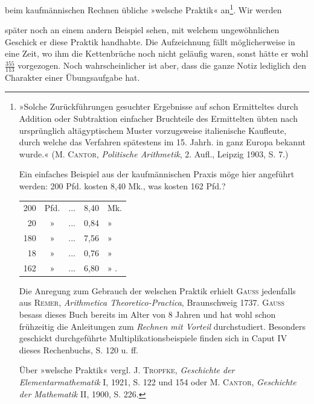 beim kaufmännischen Rechnen übliche »welsche Praktik« an\footnote{»Solche Zurückführungen gesuchter Ergebnisse auf schon Ermitteltes durch Addition oder Subtraktion einfacher Bruchteile des Ermittelten übten nach ursprünglich altägyptischem Muster vorzugsweise italienische Kaufleute, durch welche das Verfahren spätestens im 15. Jahrh. in ganz Europa bekannt wurde.« (\textsc{M. Cantor}, \textit{Politische Arithmetik}, 2. Aufl., Leipzig 1903, S. 7.)
\par Ein einfaches Beispiel aus der kaufmännischen Praxis möge hier angeführt werden: 200 Pfd. kosten 8,40 Mk., was kosten 162 Pfd.?
\begin{center}\begin{tabular}{r@{\enspace}c@{\quad}c@{\quad}r@{\enspace}l}
200&Pfd.&.\quad .\quad .&8,40&Mk.\\
20&»&.\quad .\quad .&0,84&»\\\hline
180&»&.\quad .\quad .&7,56&»\\
18&»&.\quad .\quad .&0,76&»\\\hline
162&»&.\quad .\quad .&6,80&» .
\end{tabular}\end{center}
\par Die Anregung zum Gebrauch der welschen Praktik erhielt \textsc{Gauss} jedenfalls aus \textsc{Remer}, \textit{Arithmetica Theoretico-Practica}, Braunschweig 1737. \textsc{Gauss} besass dieses Buch bereits im Alter von 8 Jahren und hat wohl schon frühzeitig die Anleitungen zum \textit{Rechnen mit Vorteil} durchstudiert. Besonders geschickt durchgeführte Multiplikationsbeispiele finden sich in Caput IV dieses Rechenbuchs, S. 120 u. ff.
\par Über »welsche Praktik« vergl. \textsc{J. Tropfke}, \textit{Geschichte der Elementarmathematik} I, 1921, S. 122 und 154 oder \textsc{M. Cantor}, \textit{Geschichte der Mathematik} II, 1900, S. 226.}. Wir werden
\par\clearpage{}
\noindent später noch an einem andern Beispiel sehen, mit welchem ungewöhnlichen
Geschick er diese Praktik handhabte. Die Aufzeichnung fällt möglicherweise
in eine Zeit, wo ihm die Kettenbrüche noch nicht geläufig waren, sonst hätte
er wohl $\frac{355}{113}$ vorgezogen. Noch wahrscheinlicher ist aber, dass die ganze
Notiz lediglich den Charakter einer Übungsaufgabe hat.
\par\clearpage\endgroup

